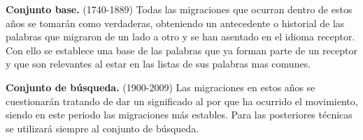 \textbf{Conjunto base.} (1740-1889) Todas las migraciones que ocurran dentro de estos años se tomarán como verdaderas, obteniendo un antecedente o historial de las palabras que migraron de un lado a otro y se han asentado en el idioma receptor. Con ello se establece una base de las palabras que ya forman parte de un receptor y que son relevantes al estar en las listas de sus palabras mas comunes. 

\textbf{Conjunto de búsqueda.} (1900-2009) Las migraciones en estos años se cuestionarán tratando de dar un significado al por que ha ocurrido el movimiento,  siendo en este periodo las migraciones más estables. Para las posteriores técnicas se utilizará siempre al conjunto de búsqueda.


